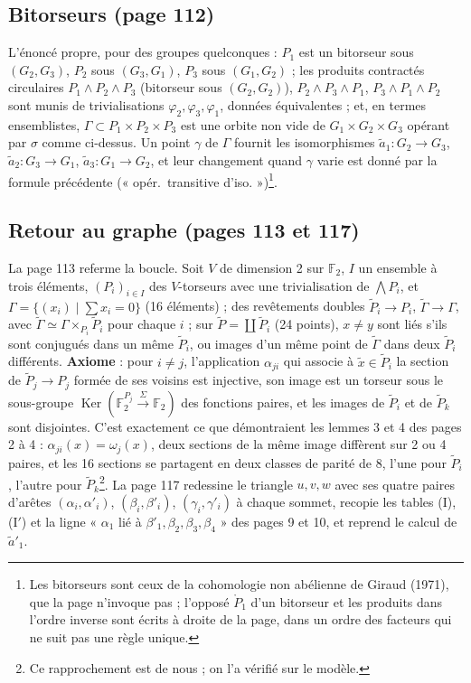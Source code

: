 \documentclass[11pt,a4paper]{article}
\begin{document}
\subsection*{Bitorseurs (page 112)}

L'énoncé propre, pour des groupes quelconques : $P_1$ est un bitorseur sous
$(G_2, G_3)$, $P_2$ sous $(G_3, G_1)$, $P_3$ sous $(G_1, G_2)$ ; les produits
contractés circulaires $P_1 \wedge P_2 \wedge P_3$ (bitorseur sous $(G_2,
G_2)$), $P_2 \wedge P_3 \wedge P_1$, $P_3 \wedge P_1 \wedge P_2$ sont munis de
trivialisations $\varphi_2, \varphi_3, \varphi_1$, données équivalentes ; et,
en termes ensemblistes, $\Gamma \subset P_1 \times P_2 \times P_3$ est une
orbite non vide de $G_1 \times G_2 \times G_3$ opérant par $\sigma$ comme
ci-dessus. Un point $\gamma$ de $\Gamma$ fournit les isomorphismes $\tilde
a_1 : G_2 \to G_3$, $\tilde a_2 : G_3 \to G_1$, $\tilde a_3 : G_1 \to G_2$, et
leur changement quand $\gamma$ varie est donné par la formule précédente
(« opér.\ transitive d'iso. »)\footnote{Les bitorseurs sont ceux de la
cohomologie non abélienne de Giraud (1971), que la page n'invoque pas ;
l'opposé $\mathring{P}_1$ d'un bitorseur et les produits dans l'ordre inverse
sont écrits à droite de la page, dans un ordre des facteurs qui ne suit pas
une règle unique.}.

\subsection*{Retour au graphe (pages 113 et 117)}

La page 113 referme la boucle. Soit $V$ de dimension 2 sur $\mathbb{F}_2$, $I$
un ensemble à trois éléments, $(P_i)_{i \in I}$ des $V$-torseurs avec une
trivialisation de $\bigwedge P_i$, et $\Gamma = \lbrace (x_i) \mid \sum x_i =
0\rbrace$ (16 éléments) ; des revêtements doubles $\widetilde P_i \to P_i$,
$\widetilde\Gamma \to \Gamma$, avec $\widetilde\Gamma \simeq \Gamma \times_{P_i}
\widetilde P_i$ pour chaque $i$ ; sur $\widetilde P = \coprod \widetilde P_i$ (24
points), $x \neq y$ sont liés s'ils sont conjugués dans un même $\widetilde
P_i$, ou images d'un même point de $\widetilde\Gamma$ dans deux $\widetilde
P_i$ différents. \textbf{Axiome} : pour $i \neq j$, l'application $\alpha_{ji}$
qui associe à $\tilde x \in \widetilde P_i$ la section de $\widetilde P_j \to
P_j$ formée de ses voisins est injective, son image est un torseur sous le
sous-groupe $\operatorname{Ker}(\mathbb{F}_2^{P_j} \xrightarrow{\Sigma}
\mathbb{F}_2)$ des fonctions paires, et les images de $\widetilde P_i$ et de
$\widetilde P_k$ sont disjointes. C'est exactement ce que démontraient les
lemmes 3 et 4 des pages 2 à 4 : $\alpha_{ji}(x) = \omega_j(x)$, deux sections
de la même image diffèrent sur 2 ou 4 paires, et les 16 sections se
partagent en deux classes de parité de 8, l'une pour $\widetilde P_i$, l'autre
pour $\widetilde P_k$\footnote{Ce rapprochement est de nous ; on l'a vérifié
sur le modèle.}. La page 117 redessine le triangle $u, v, w$ avec ses quatre
paires d'arêtes $(\alpha_i, \alpha'_i)$, $(\beta_i, \beta'_i)$, $(\gamma_i,
\gamma'_i)$ à chaque sommet, recopie les tables (I), (I$'$) et la ligne
« $\alpha_1$ lié à $\beta'_1, \beta_2, \beta_3, \beta_4$ » des pages 9 et 10,
et reprend le calcul de $\tilde a'_1$.
\end{document}
